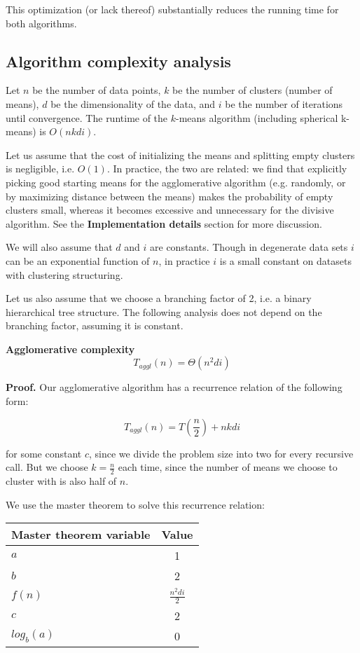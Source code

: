 \documentclass[../tech_report_1.tex]{subfiles}
\begin{document}
This optimization (or lack thereof) substantially reduces the running time for both algorithms.

\subsection*{Algorithm complexity analysis}

Let $n$ be the number of data points, $k$ be the number of clusters (number of means), $d$ be the dimensionality of the data, and $i$ be the number of iterations until convergence. The runtime of the $k$-means algorithm (including spherical k-means) is $O(nkdi)$.

Let us assume that the cost of initializing the means and splitting empty clusters is negligible, i.e. $O(1)$. In practice, the two are related: we find that explicitly picking good starting means for the agglomerative algorithm (e.g. randomly, or by maximizing distance between the means) makes the probability of empty clusters small, whereas it becomes excessive and unnecessary for the divisive algorithm. See the \textbf{Implementation details} section for more discussion.

We will also assume that $d$ and $i$ are constants. Though in degenerate data sets $i$ can be an exponential function of $n$, in practice $i$ is a small constant on datasets with clustering structuring.

Let us also assume that we choose a branching factor of 2, i.e. a binary hierarchical tree structure. The following analysis does not depend on the branching factor, assuming it is constant.

\begin{theorem}

\textbf{Agglomerative complexity} $$T_{aggl}(n) = \Theta(n^2di)$$

\end{theorem}

\textbf{Proof.} Our agglomerative algorithm has a recurrence relation of the following form:

$$ T_{aggl}(n) = T(\frac{n}{2}) + nkdi $$

for some constant $c$, since we divide the problem size into two for every recursive call. But we choose $k=\frac{n}{2}$ each time, since the number of means we choose to cluster with is also half of $n$.

We use the master theorem\cite{thomas2001introduction} to solve this recurrence relation:

\begin{table}[ht]
\centering
\begin{tabular}{l || c }
\hline
\textbf{Master theorem variable} & \textbf{Value} \\
\hline
$a$ & 1 \\
$b$ & 2 \\
$f(n)$ & $\frac{n^2di}{2}$ \\
$c$ & 2 \\
$log_b(a)$ & 0 \\
\hline
\end{tabular}
\end{table}
\end{document}
